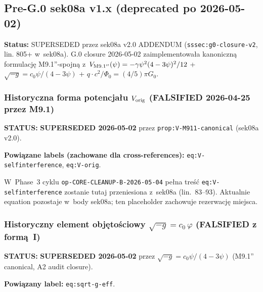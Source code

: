 \subsection{Pre-G.0 sek08a v1.x (deprecated po 2026-05-02)}%
\label{app:pivot-sek08a-v1x}

\textbf{Status:} SUPERSEDED przez sek08a v2.0 ADDENDUM
(\texttt{sssec:g0-closure-v2}, lin. 805+ w~sek08a). G.0 closure 2026-05-02
zaimplementowa\l{}a kanoniczn\k{a} formulacj\k{e} M9.1''-spojn\k{a}
z~$V_{\rm M9.1''}(\psi) = -\gamma\psi^2(4-3\psi)^2/12$ +
$\sqrt{-g} = c_0\psi/(4-3\psi)$ + $q\cdot c^2/\Phi_0 = (4/5)\pi G_0$.

\subsubsection{Historyczna forma potencja\l{}u
$V_{\rm orig}$ (FALSIFIED 2026-04-25 przez M9.1)}%
\label{app:V-orig-deprecated}

\textbf{STATUS:} \textbf{SUPERSEDED 2026-05-02} przez
\texttt{prop:V-M911-canonical} (sek08a v2.0).

\textbf{Powiązane labels (zachowane dla cross-references):}
\texttt{eq:V-selfinterference}, \texttt{eq:V-orig}.


\begin{remark}%
\label{rem:V-orig-placeholder}
W~Phase~3 cyklu \texttt{op-CORE-CLEANUP-B-2026-05-04} pe\l{}na tre\'s\'c
\texttt{eq:V-selfinterference} zostanie tutaj przeniesiona z~sek08a
(lin.~83--93). Aktualnie equation pozostaje w~body sek08a; ten
placeholder zachowuje rezerwacj\k{e} miejsca.
\end{remark}

\subsubsection{Historyczny element obj\k{e}to\'sciowy
$\sqrt{-g} = c_0\,\varphi$ (FALSIFIED z form\k{a}~I)}%
\label{app:sqrt-g-orig-deprecated}

\textbf{STATUS:} \textbf{SUPERSEDED 2026-05-02} przez
$\sqrt{-g} = c_0\psi/(4-3\psi)$ (M9.1'' canonical, A2 audit closure).

\textbf{Powiązany label:} \texttt{eq:sqrt-g-eff}.


